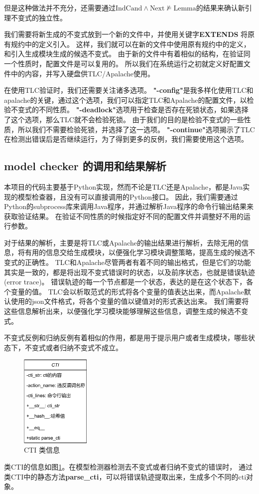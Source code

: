 但是这种做法并不充分，还需要通过$\text{IndCand} \wedge \text{Next} \nvDash \text{Lemma}$的结果来确认新引理不变式的独立性。

我们需要将新生成的不变式放到一个新的文件中，并使用关键字\textbf{EXTENDS} 将原有规约中的定义引入。
这样，我们就可以在新的文件中使用原有规约中的定义，和引入生成模块生成的候选不变式。
由于新的\TLA 文件中有着相似的结构，在验证同一个性质时，配置文件是可以复用的。
所以我们在系统运行之初就定义好配置文件中的内容，并写入硬盘供TLC/Apalache使用。

在使用TLC验证时，我们还需要关注诸多选项。
\textbf{"-config"}是我多样化使用TLC和apalache的关键，通过这个选项，我们可以指定TLC和Apalache的配置文件，以检验不变式的不同性质。
\textbf{"-deadlock"}选项用于检查是否存在死锁状态，如果选择了这个选项，那么TLC就不会检验死锁。
由于我们的目的是检验不变式的一些性质，所以我们不需要检验死锁，并选择了这一选项。
\textbf{"-continue"}选项揭示了TLC在检测出错误后是否继续运行，为了得到更多的反例，我们需要使用这个选项。

\subsection{model checker 的调用和结果解析}
本项目的代码主要基于Python实现，然而不论是TLC还是Apalache，都是Java实现的模型检查器，且没有可以直接调用的Python接口。
因此，我们需要通过Python的subprocess库来调用Java程序，并通过解析Java程序的命令行输出结果来获取验证结果。
在验证不同性质的时候指定好不同的配置文件并调整好不用的运行参数。

对于结果的解析，主要是将TLC或Apalache的输出结果进行解析，去除无用的信息，将有用的信息交给生成模块，以便强化学习模块调整策略，提高生成的候选不变式的正确性。
TLC和Apalache尽管两者有着不同的输出格式，但是它们的功能其实是一致的，都是将出现不变式错误时的状态，以及前序状态，也就是错误轨迹(error trace)。
错误轨迹的每一个节点都是一个状态，表达的是在这个状态下，各个变量的值。
TLC会以析取范式的形式将各个变量的值表达出来，而Apalache默认使用的json文件格式，将各个变量的值以键值对的形式表达出来。
我们需要将这些信息解析出来，以便强化学习模块能够理解这些信息，调整生成的候选不变式。

不变式反例和归纳反例有着相似的作用，都是用于提示用户或者生成模块，哪些状态下，不变式或者归纳不变式不成立。

\begin{figure}[htb]
	\centering
	\includegraphics[width=0.3\textwidth]{figures/class_cti.pdf}
	\caption{CTI 类信息}
	\label{fig:class_cti}
\end{figure}
类CTI的信息如图\ref{fig:class_cti}。在模型检测器检测去不变式或者归纳不变式的错误时，
通过类CTI中的静态方法\textbf{parse\_cti}，可以将错误轨迹提取出来，生成多个不同的cti对象。

